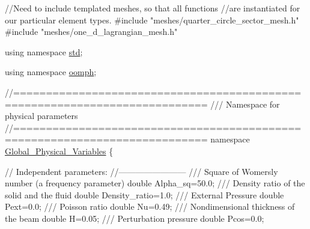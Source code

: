 \begin{DoxyCodeInclude}
\textcolor{comment}{//Need to include templated meshes, so that all functions}
\textcolor{comment}{//are instantiated for our particular element types.}
\textcolor{preprocessor}{#include "meshes/quarter\_circle\_sector\_mesh.h"}
\textcolor{preprocessor}{#include "meshes/one\_d\_lagrangian\_mesh.h"}

\textcolor{keyword}{using namespace }\hyperlink{namespacestd}{std};

\textcolor{keyword}{using namespace }\hyperlink{namespaceoomph}{oomph};

\textcolor{comment}{//===========================================================================}\textcolor{comment}{}
\textcolor{comment}{/// Namespace for physical parameters}
\textcolor{comment}{}\textcolor{comment}{//===========================================================================}
\textcolor{keyword}{namespace }\hyperlink{namespaceGlobal__Physical__Variables}{Global\_Physical\_Variables}
\{

 \textcolor{comment}{// Independent parameters:}
 \textcolor{comment}{//------------------------}
\textcolor{comment}{}
\textcolor{comment}{ /// Square of Womersly number (a frequency parameter)}
\textcolor{comment}{} \textcolor{keywordtype}{double} Alpha\_sq=50.0;
\textcolor{comment}{}
\textcolor{comment}{ /// Density ratio of the solid and the fluid}
\textcolor{comment}{} \textcolor{keywordtype}{double} Density\_ratio=1.0; 
\textcolor{comment}{}
\textcolor{comment}{ /// External Pressure}
\textcolor{comment}{} \textcolor{keywordtype}{double} Pext=0.0;
\textcolor{comment}{}
\textcolor{comment}{ /// Poisson ratio}
\textcolor{comment}{} \textcolor{keywordtype}{double} Nu=0.49;
\textcolor{comment}{}
\textcolor{comment}{ /// Nondimensional thickness of the beam }
\textcolor{comment}{} \textcolor{keywordtype}{double} H=0.05;
\textcolor{comment}{}
\textcolor{comment}{ /// Perturbation pressure}
\textcolor{comment}{} \textcolor{keywordtype}{double} Pcos=0.0;



\end{DoxyCodeInclude}
